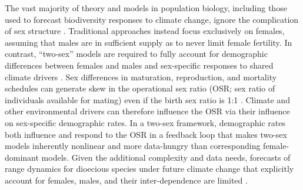\documentclass[12pt]{article}\usepackage[]{graphicx}\usepackage[dvipsnames]{xcolor}
\newcommand{\tom}[2]{{\color{red}{#1}}\footnote{\textit{\color{red}{#2}}}}
\begin{document}
The vast majority of theory and models in population biology, including those used to forecast biodiversity responses to climate change, ignore the complication of sex structure \citep[but see][] {pottier2021sexual,ellis2017does,Elena}.
Traditional approaches instead focus exclusively on females, assuming that males are in sufficient supply as to never limit female fertility. 
In contrast, ``two-sex'' models are required to fully account for demographic differences between females and males and sex-specific responses to shared climate drivers \citep{gerber2014two,miller2011sex}. 
Sex differences in maturation, reproduction, and mortality schedules can generate skew in the operational sex ratio (OSR; sex ratio of individuals available for mating) even if the birth sex ratio is 1:1 \citep{eberhart2017sex,shelton2010ecological}. 
Climate and other environmental drivers can therefore influence the OSR via their influence on sex-specific demographic rates. 
In a two-sex framework, demographic rates both influence and respond to the OSR in a feedback loop that makes two-sex models inherently nonlinear and more data-hungry than corresponding female-dominant models. 
Given the additional complexity and data needs, forecasts of range dynamics for dioecious species under future climate change that explicitly account for females, males, and their inter-dependence are limited \citep{petry2016sex,lynch2014climate}.


\end{document}
